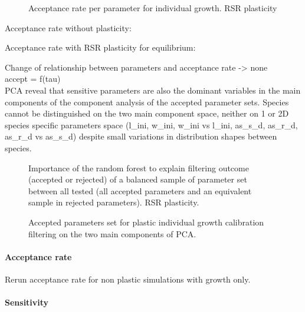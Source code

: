 \begin{figure}
\caption{Acceptance rate per parameter for individual growth. RSR plasticity}
\end{figure}

Acceptance rate without plasticity:

Acceptance rate with RSR plasticity for equilibrium:


Change of relationship between parameters and acceptance rate -> none\\
accept = f(tau)\\

PCA reveal that sensitive parameters are also the dominant variables in the main components of the component analysis of the accepted parameter sets. Species cannot be distinguished on the two main component space, neither on 1 or 2D species specific parameters space (l\_ini, w\_ini, w\_ini vs l\_ini, as\_s\_d, as\_r\_d, as\_r\_d vs as\_s\_d) despite small variations in distribution shapes between species.\\



\begin{figure}
\caption{Importance of the random forest to explain filtering outcome (accepted or rejected) of a balanced sample of parameter set between all tested (all accepted parameters and an equivalent sample in rejected parameters).  RSR plasticity.}
\end{figure}

\begin{figure}
\caption{Accepted parameters set for plastic individual growth calibration filtering  on the two main components of PCA.}
\end{figure}

\paragraph{Acceptance rate}

Rerun acceptance rate for non plastic simulations with growth only.

\paragraph{Sensitivity}

